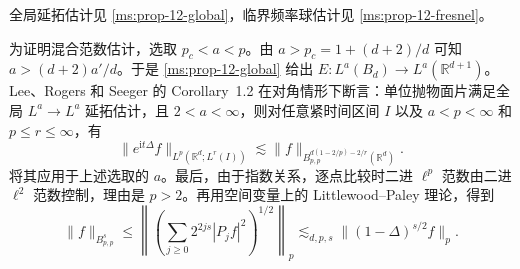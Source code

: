全局延拓估计见 \ref{ms:prop-12-global}，临界频率球估计见 \ref{ms:prop-12-fresnel}。

为证明混合范数估计，选取 $p_c<a<p$。由 $a>p_c=1+(d+2)/d$ 可知 $a>(d+2)a'/d$。于是 \ref{ms:prop-12-global} 给出 $E:L^a(B_d)\to L^a(\mathbb R^{d+1})$。Lee、Rogers 和 Seeger 的 Corollary~1.2 \cite{r-51} 在对角情形下断言：单位抛物面片满足全局 $L^a\to L^a$ 延拓估计，且 $2<a<\infty$，则对任意紧时间区间 $I$ 以及 $a<p<\infty$ 和 $p\leq r\leq\infty$，有
\[
\|e^{\mathrm it\Delta}f\|_{L^p(\mathbb R^d;L^r(I))}
 \lesssim \|f\|_{B^{d(1-2/p)-2/r}_{p,p}(\mathbb R^d)}.
\]
将其应用于上述选取的 $a$。最后，由于指数关系，逐点比较时二进 $\ell^p$ 范数由二进 $\ell^2$ 范数控制，理由是 $p>2$。再用空间变量上的 Littlewood--Paley 理论，得到
\[
\|f\|_{B^s_{p,p}}\leq
 \left\|\left(\sum_{j\geq0}2^{2js}|P_j f|^2\right)^{1/2}\right\|_p
 \lesssim_{d,p,s}\|(1-\Delta)^{s/2}f\|_p.
\]
